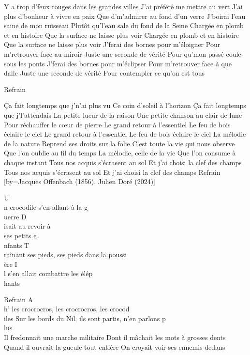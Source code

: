 \beginverse
Y a trop d'feux rouges dans les grandes villes
J'ai préféré me mettre au vert
J'ai plus d'bonheur à vivre en paix
Que d'm'admirer au fond d'un verre
J'boirai l'eau saine de mon ruisseau
Plutôt qu'l'eau sale du fond de la Seine
Chargée en plomb et en histoire
Que la surface ne laisse plus voir
Chargée en plomb et en histoire
Que la surface ne laisse plus voir
J'ferai des bornes pour m'éloigner
Pour m'retrouver face au miroir
Juste une seconde de vérité
Pour qu'mon passé coule sous les ponts
J'ferai des bornes pour m'éclipser
Pour m'retrouver face à que dalle
Juste une seconde de vérité
Pour contempler ce qu'on est tous
\endverse

	Refrain

\beginverse
Ça fait longtemps que j'n'ai plus vu
Ce coin d'soleil à l'horizon
Ça fait longtemps que j'l'attendais
La petite lueur de la raison
Une petite chanson au clair de lune
Pour réchauffer le cœur de pierre
Le grand retour à l'essentiel
Le feu de bois éclaire le ciel
Le grand retour à l'essentiel
Le feu de bois éclaire le ciel
La mélodie de la nature
Reprend ses droits sur la folie
C'est toute la vie qui nous observe
Que l'on oublie au fil du temps
La mélodie, celle de la vie
Que l'on consume à chaque instant
Tous nos acquis s'écrasent au sol
Et j'ai choisi la clef des champs
Tous nos acquis s'écrasent au sol
Et j'ai choisi la clef des champs
Refrain \\[bis]
\endverse
\endsong
{}[by={Jacques Offenbach (1856), Julien Doré (2024)}]

\beginverse
U\\[Ré]n crocodile s'en allant à la g\\[La]uerre
D\\[Mi]isait au revoir à\\[Mi7] ses petits e\\[La]nfants
T\\[Ré]raînant ses pieds, ses pieds dans la poussi\\[La]ère
I\\[Mi]l s'en allait combattre les élép\\[La7]hants
\endverse

	Refrain
A\\[Ré]h' les crocrocros, les crocrocros, les crocod\\[La7]iles
Sur les bords du Nil, ils sont partis, n'en parlons p\\[Ré]lus
\\[bis]

\beginverse
Il fredonnait une marche militaire
Dont il mâchait les mots à grosses dents
Quand il ouvrait la gueule tout entière
On croyait voir ses ennemis dedans
\endverse

